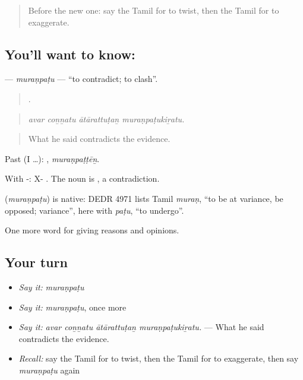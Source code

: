 \label{lesson:TA-C359-muranpatu}



\begin{quote}
Before the new one: say the Tamil for to twist, then the Tamil for to exaggerate.
\end{quote}

\subsection*{You'll want to know: }
\textbf{} — \emph{muraṇpaṭu} — \textquotedblleft{}to contradict; to clash\textquotedblright{}.

\begin{quote}
   .
\end{quote}

\begin{quote}
\emph{avar coṉṉatu ātārattuṭaṉ muraṇpaṭukiṟatu.}
\end{quote}

\begin{quote}
What he said contradicts the evidence.
\end{quote}

Past (I …): , \emph{muraṇpaṭṭēṉ}.

With -: X- . The noun is , a contradiction.

\begin{cousinweb}
\textbf{} (\emph{muraṇpaṭu}) is native: DEDR 4971 lists Tamil \emph{muraṇ}, \textquotedblleft{}to be at variance, be opposed; variance\textquotedblright{}, here with \emph{paṭu}, \textquotedblleft{}to undergo\textquotedblright{}.
\end{cousinweb}

\begin{grammarlens}[title={What you've built}]
One more word for giving reasons and opinions.
\end{grammarlens}

\subsection*{Your turn}
\begin{itemize}
\raggedright
  \item \emph{Say it:} \emph{muraṇpaṭu}
  \item \emph{Say it:} \emph{muraṇpaṭu}, once more
  \item \emph{Say it:} \emph{avar coṉṉatu ātārattuṭaṉ muraṇpaṭukiṟatu.} — What he said contradicts the evidence.
  \item \emph{Recall:} say the Tamil for to twist, then the Tamil for to exaggerate, then say \emph{muraṇpaṭu} again
\end{itemize}

